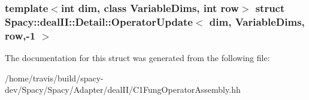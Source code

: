 \subsubsection*{template$<$int dim, class Variable\-Dims, int row$>$ struct Spacy\-::deal\-I\-I\-::\-Detail\-::\-Operator\-Update$<$ dim, Variable\-Dims, row,-\/1 $>$}



\-The documentation for this struct was generated from the following file\-:\begin{DoxyCompactItemize}
\item 
/home/travis/build/spacy-\/dev/\-Spacy/\-Spacy/\-Adapter/deal\-I\-I/\-C1\-Fung\-Operator\-Assembly.\-hh\end{DoxyCompactItemize}
